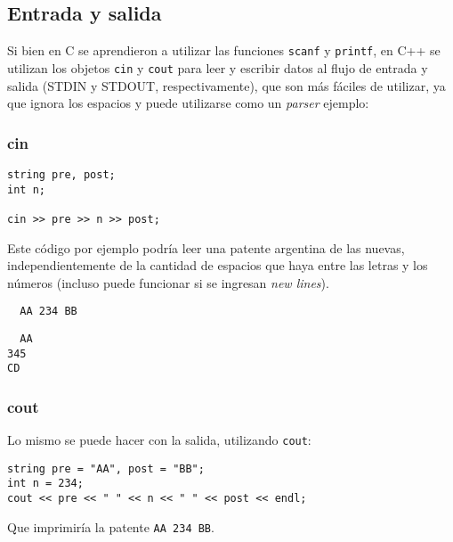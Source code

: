 \subsection{Entrada y salida}

Si bien en C se aprendieron a utilizar las funciones \texttt{scanf} y \texttt{printf}, en C++ se utilizan los objetos
\texttt{cin} y \texttt{cout} para leer y escribir datos al flujo de entrada y salida (STDIN y STDOUT, respectivamente),
que son más fáciles de utilizar, ya que ignora los espacios y puede utilizarse como un \textit{parser} ejemplo:


\subsubsection{cin}

\begin{lstlisting}
string pre, post;
int n;

cin >> pre >> n >> post;
\end{lstlisting}

Este código por ejemplo podría leer una patente argentina de las nuevas, independientemente de la cantidad de espacios
que haya entre las letras y los números (incluso puede funcionar si se ingresan \textit{new lines}).

\begin{lstlisting}
  AA 234 BB
\end{lstlisting}

\begin{lstlisting}
  AA
345
CD
\end{lstlisting}

\subsubsection{cout}

Lo mismo se puede hacer con la salida, utilizando \texttt{cout}:

\begin{lstlisting}
string pre = "AA", post = "BB";
int n = 234;
cout << pre << " " << n << " " << post << endl;
\end{lstlisting}

Que imprimiría la patente \texttt{AA 234 BB}.


